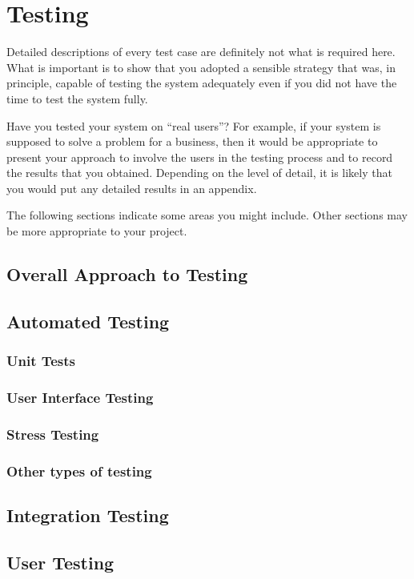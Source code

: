 \chapter{Testing}

Detailed descriptions of every test case are definitely not what is required here. What is important is to show that you adopted a sensible strategy that was, in principle, capable of testing the system adequately even if you did not have the time to test the system fully.

Have you tested your system on ``real users''? For example, if your system is supposed to solve a problem for a business, then it would be appropriate to present your approach to involve the users in the testing process and to record the results that you obtained. Depending on the level of detail, it is likely that you would put any detailed results in an appendix.

The following sections indicate some areas you might include. Other sections may be more appropriate to your project. 

\section{Overall Approach to Testing}

\section{Automated Testing}

\subsection{Unit Tests}

\subsection{User Interface Testing}

\subsection{Stress Testing}

\subsection{Other types of testing}

\section{Integration Testing}

\section{User Testing}